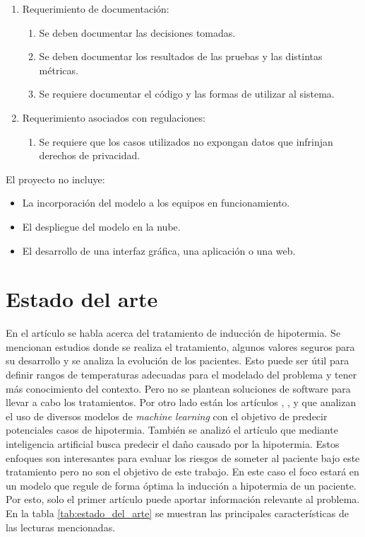 \begin{enumerate}
\begin{enumerate}
	\end{enumerate}
	\item Requerimiento de documentación:
	\begin{enumerate}
		\item Se deben documentar las decisiones tomadas.
		\item Se deben documentar los resultados de las pruebas y las distintas métricas.
		\item Se requiere documentar el código y las formas de utilizar al sistema.
	\end{enumerate}
	\item Requerimiento asociados con regulaciones:
	\begin{enumerate}
		\item Se requiere que los casos utilizados no expongan datos que infrinjan derechos de privacidad.
	\end{enumerate}
\end{enumerate}


El proyecto no incluye: 
\begin{itemize}
	\item La incorporación del modelo a los equipos en funcionamiento.
	\item El despliegue del modelo en la nube.
	\item El desarrollo de una interfaz gráfica, una aplicación o una web.
\end{itemize}

\section{Estado del arte}

En el artículo \citep{jcm12062095} se habla acerca del tratamiento de inducción de hipotermia. Se mencionan estudios donde se realiza el tratamiento, algunos valores seguros para su desarrollo y se analiza la evolución de los pacientes. Esto puede ser útil para definir rangos de temperaturas adecuadas para el modelado del problema y tener más conocimiento del contexto. Pero no se plantean soluciones de software para llevar a cabo los tratamientos.
Por otro lado están los artículos \citep{jcm12134434},	\citep{10.3389/fphys.2022.921884}, \citep{10125880} y \citep{doi:10.1177/09544119241266375} que analizan el uso de diversos modelos de \textit{machine learning} con el objetivo de predecir potenciales casos de hipotermia. También se analizó el artículo \citep{SHAMMI2022107013} que mediante inteligencia artificial busca predecir el daño causado por la hipotermia. Estos enfoques son interesantes para evaluar los riesgos de someter al paciente bajo este tratamiento pero no son el objetivo de este trabajo. En este caso el foco estará en un modelo que regule de forma óptima la inducción a hipotermia de un paciente. Por esto, solo el primer artículo puede aportar información relevante al problema. En la tabla \ref{tab:estado_del_arte} se muestran las principales características de las lecturas mencionadas.

